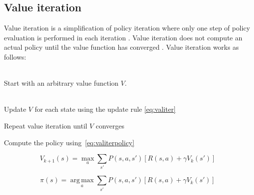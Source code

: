 \subsection{Value iteration}
\label{sec:valueiteration}

Value iteration is a simplification of policy iteration where only one step of
policy evaluation is performed in each iteration
. Value iteration does not compute an actual
policy until the value function has converged \parencite{barto1998reinforcement}. Value iteration works as follows:

\begin{description}
\item[Initialization] \hfill \\
    Start with an arbitrary value function $V$.
\item[Value iteration] \hfill \\
    Update $V$ for each state using the update rule \eqref{eq:valiter}
\item Repeat value iteration until $V$ converges
\item Compute the policy using~\eqref{eq:valiterpolicy}
\end{description}

\begin{equation} \label{eq:valiter}
V_{k+1}(s) = \max_a \sum_{s'}{P(s, a, s') \left[R(s, a) + \gamma V_k(s')\right]}
\end{equation}

\begin{equation} \label{eq:valiterpolicy}
\pi(s) = \operatorname*{arg\,max}_a \sum_{s'}{P(s, a, s') \left[R(s, a) + \gamma V_k(s')\right]}
\end{equation}
